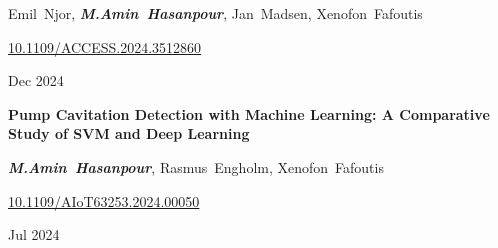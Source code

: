 {{            \vspace{0.10 cm}

            \mbox{Emil Njor}, \mbox{\textbf{\textit{M.Amin Hasanpour}}}, \mbox{Jan Madsen}, \mbox{Xenofon Fafoutis}

            \vspace{0.10 cm}

            \href{https://doi.org/10.1109/ACCESS.2024.3512860}{10.1109/ACCESS.2024.3512860}
        }
        {\raggedleft Dec 2024}

        \vspace{0.2 cm}

        \multicolentry{*, 2cm}
        {
            \textbf{Pump Cavitation Detection with Machine Learning: A Comparative Study of SVM and Deep Learning}

            \vspace{0.10 cm}

            \mbox{\textbf{\textit{M.Amin Hasanpour}}}, \mbox{Rasmus Engholm}, \mbox{Xenofon Fafoutis}

            \vspace{0.10 cm}

            \href{https://doi.org/10.1109/AIoT63253.2024.00050}{10.1109/AIoT63253.2024.00050}
        }
        {\raggedleft Jul 2024}
    }{}
